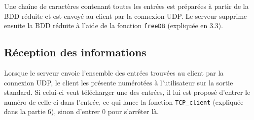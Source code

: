 Une chaîne de caractères contenant toutes les entrées est préparées à partir de la BDD réduite et est envoyé au client par la connexion UDP. Le serveur supprime ensuite la BDD réduite à l'aide de la fonction \verb|freeDB| (expliquée en 3.3).

\subsection{Réception des informations}
Lorsque le serveur envoie l'ensemble des entrées trouvées au client par la connexion UDP, le client les présente numérotées à l'utilisateur sur la sortie standard. Si celui-ci veut télécharger une des entrées, il lui est proposé d'entrer le numéro de celle-ci dans l'entrée, ce qui lance la fonction \verb|TCP_client| (expliquée dans la partie 6), sinon d'entrer 0 pour s'arrêter là.